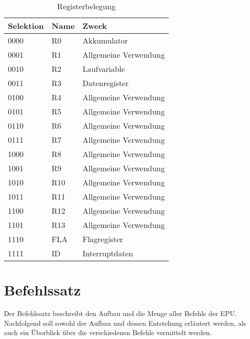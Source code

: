 \begin{table}[h]
\centering
\begin{tabular}{lll}
\toprule
Selektion & Name & Zweck\\
\midrule
0000 & R0  & Akkumulator\\
0001 & R1  & Allgemeine Verwendung\\
0010 & R2  & Laufvariable\\
0011 & R3  & Datenregister\\
0100 & R4  & Allgemeine Verwendung\\
0101 & R5  & Allgemeine Verwendung\\
0110 & R6  & Allgemeine Verwendung\\
0111 & R7  & Allgemeine Verwendung\\
1000 & R8  & Allgemeine Verwendung\\
1001 & R9  & Allgemeine Verwendung\\
1010 & R10 & Allgemeine Verwendung\\
1011 & R11 & Allgemeine Verwendung\\
1100 & R12 & Allgemeine Verwendung\\
1101 & R13 & Allgemeine Verwendung\\
1110 & FLA & Flagregister\\
1111 & ID  & Interruptdaten\\
\bottomrule
\end{tabular}
\caption{Registerbelegung}
\label{tab:registerbelegung}
\end{table}
\pagebreak
\section{Befehlssatz}
\label{s:befehlsstz}
Der Befehlssatz beschreibt den Aufbau und die Menge aller Befehle der \ac{EPU}.
Nachfolgend soll sowohl der Aufbau und dessen Entstehung erläutert werden, als
auch ein Überblick über die verschiedenen Befehle vermittelt werden.

